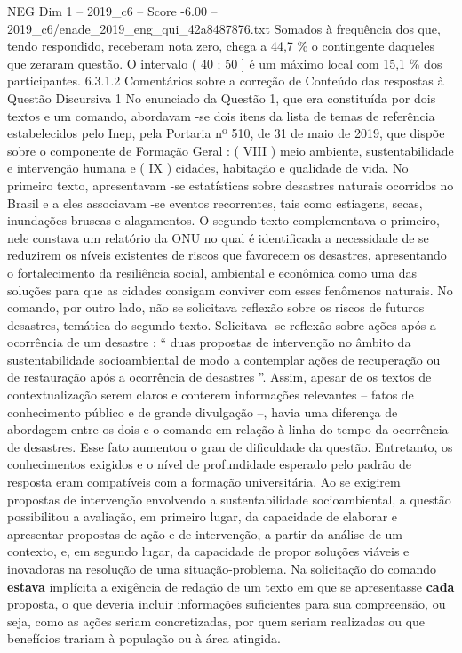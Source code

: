 \begin{textsample}{NEG Dim 1 – 2019\_c6 – Score -6.00 – 2019\_c6/enade\_2019\_eng\_qui\_42a8487876.txt}
Somados à frequência dos que, tendo respondido, receberam nota zero, chega a 44,7 \% o contingente daqueles que zeraram questão.
O intervalo ( 40 ; 50 ] é um máximo local com 15,1 \% dos participantes. 6.3.1.2 Comentários sobre a correção de Conteúdo das respostas à Questão Discursiva 1 No enunciado da Questão 1, que era constituída por dois textos e um comando, abordavam -se dois itens da lista de temas de referência estabelecidos pelo Inep, pela Portaria nº 510, de 31 de maio de 2019, que dispõe sobre o componente de Formação Geral : ( VIII ) meio ambiente, sustentabilidade e intervenção humana e ( IX ) cidades, habitação e qualidade de vida.
No primeiro texto, apresentavam -se estatísticas sobre desastres naturais ocorridos no Brasil e a eles associavam -se eventos recorrentes, tais como estiagens, secas, inundações bruscas e alagamentos.
O segundo texto complementava o primeiro, nele constava um relatório da ONU no qual é identificada a necessidade de se reduzirem os níveis existentes de riscos que favorecem os desastres, apresentando o fortalecimento da resiliência social, ambiental e econômica como uma das soluções para que as cidades consigam conviver com esses fenômenos naturais.
No comando, por outro lado, não se solicitava reflexão sobre os riscos de futuros desastres, temática do segundo texto.
Solicitava -se reflexão sobre ações após a ocorrência de um desastre : “ duas propostas de intervenção no âmbito da sustentabilidade socioambiental de modo a contemplar ações de recuperação ou de restauração após a ocorrência de desastres ”.
Assim, apesar de os textos de contextualização serem claros e conterem informações relevantes – fatos de conhecimento público e de grande divulgação –, havia uma diferença de abordagem entre os dois e o comando em relação à linha do tempo da ocorrência de desastres.
Esse fato aumentou o grau de dificuldade da questão.
Entretanto, os conhecimentos exigidos e o nível de profundidade esperado pelo padrão de resposta eram compatíveis com a formação universitária.
Ao se exigirem propostas de intervenção envolvendo a sustentabilidade socioambiental, a questão possibilitou a avaliação, em primeiro lugar, da capacidade de elaborar e apresentar propostas de ação e de intervenção, a partir da análise de um contexto, e, em segundo lugar, da capacidade de propor soluções viáveis e inovadoras na resolução de uma situação-problema.
Na solicitação do comando \textbf{estava} implícita a exigência de redação de um texto em que se apresentasse \textbf{cada} proposta, o que deveria incluir informações suficientes para sua compreensão, ou seja, como as ações seriam concretizadas, por quem seriam realizadas ou que benefícios trariam à população ou à área atingida.

\end{textsample}

